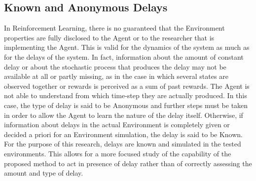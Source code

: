         \subsection{Known and Anonymous Delays}
            In Reinforcement Learning, there is no guaranteed that the Environment properties are fully disclosed to the Agent or to the researcher that is implementing the Agent. This is valid for the dynamics of the system as much as for the delays of the system. In fact, information about the amount of constant delay or about the stochastic process that produces the delay may not be available at all or partly missing, as in the case in which several states are observed together or rewards is perceived as a sum of past rewards. The Agent is not able to understand from which time-step they are actually produced. In this case, the type of delay is said to be Anonymous and further steps must be taken in order to allow the Agent to learn the nature of the delay itself. Otherwise, if information about delays in the actual Environment is completely given or decided a priori for an Environment simulation, the delay is said to be Known. \newline
            For the purpose of this research, delays are known and simulated in the tested environments. This allows for a more focused study of the capability of the proposed method to act in presence of delay rather than of correctly assessing the amount and type of delay.
        